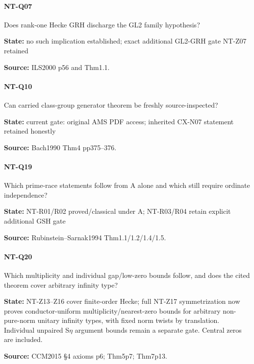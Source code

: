 \documentclass[11pt,a4paper]{article}
\begin{document}
\paragraph{NT-Q07} Does rank-one Hecke GRH discharge the GL2 family hypothesis?

\textbf{State:} no such implication established; exact additional GL2-GRH gate NT-Z07 retained

\textbf{Source:} ILS2000 p56 and Thm1.\allowbreak{}1.

\paragraph{NT-Q10} Can carried class-group generator theorem be freshly source-inspected?

\textbf{State:} current gate:\allowbreak{} original AMS PDF access; inherited CX-N07 statement retained honestly

\textbf{Source:} Bach1990 Thm4 pp375–\allowbreak{}376.

\paragraph{NT-Q19} Which prime-race statements follow from A alone and which still require ordinate independence?

\textbf{State:} NT-R01/\allowbreak{}R02 proved/\allowbreak{}classical under A; NT-R03/\allowbreak{}R04 retain explicit additional GSH gate

\textbf{Source:} Rubinstein–\allowbreak{}Sarnak1994 Thm1.\allowbreak{}1/\allowbreak{}1.\allowbreak{}2/\allowbreak{}1.\allowbreak{}4/\allowbreak{}1.\allowbreak{}5.

\paragraph{NT-Q20} Which multiplicity and individual gap/\allowbreak{}low-zero bounds follow, and does the cited theorem cover arbitrary infinity type?

\textbf{State:} NT-Z13–\allowbreak{}Z16 cover finite-order Hecke; full NT-Z17 symmetrization now proves conductor-uniform multiplicity/\allowbreak{}nearest-zero bounds for arbitrary non-pure-norm unitary infinity types, with fixed norm twists by translation.\allowbreak{} Individual unpaired S\ensuremath{\eta} argument bounds remain a separate gate.\allowbreak{} Central zeros are included.\allowbreak{}

\textbf{Source:} CCM2015 §4 axioms p6; Thm5p7; Thm7p13.
\end{document}
